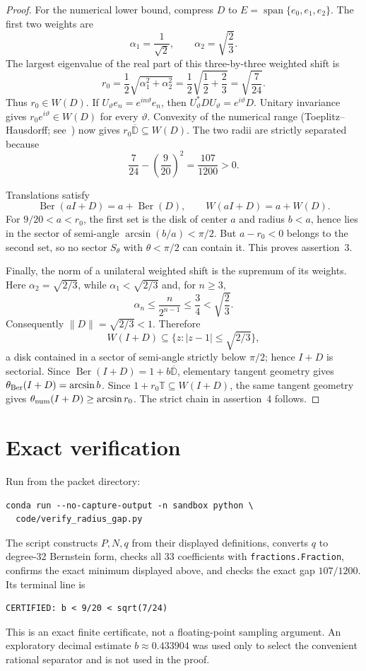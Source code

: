 \documentclass[11pt]{amsart}
\theoremstyle{definition}
\newcommand{\Ber}{\operatorname{Ber}}
\newcommand{\Num}{W}
\newcommand{\Disk}{\overline{\mathbb D}}
\begin{document}
\begin{proof}
For the numerical lower bound, compress \(D\) to
\(E=\operatorname{span}\{e_0,e_1,e_2\}\).  The first two weights are
\[
 \alpha_1=\frac1{\sqrt2},\qquad
 \alpha_2=\sqrt{\frac23}.
\]
The largest eigenvalue of the real part of this three-by-three weighted shift
is
\[
 r_0=\frac12\sqrt{\alpha_1^2+\alpha_2^2}
     =\frac12\sqrt{\frac12+\frac23}
     =\sqrt{\frac7{24}}.
\]
Thus \(r_0\in\Num(D)\).  If \(U_\vartheta e_n=e^{in\vartheta}e_n\), then
\(U_\vartheta^*DU_\vartheta=e^{i\vartheta}D\).  Unitary invariance gives
\(r_0e^{i\vartheta}\in\Num(D)\) for every \(\vartheta\).  Convexity of the
numerical range (Toeplitz--Hausdorff; see~\cite{gustafsonrao}) now gives
\(r_0\Disk\subseteq\Num(D)\).  The two radii are strictly separated because
\[
 \frac7{24}-\left(\frac9{20}\right)^2=\frac{107}{1200}>0.
\]

Translations satisfy
\[
 \Ber(aI+D)=a+\Ber(D),\qquad \Num(aI+D)=a+\Num(D).
\]
For \(9/20<a<r_0\), the first set is the disk of center \(a\) and radius
\(b<a\), hence lies in the sector of semi-angle \(\arcsin(b/a)<\pi/2\).
But \(a-r_0<0\) belongs to the second set, so no sector \(S_\theta\) with
\(\theta<\pi/2\) can contain it.  This proves assertion~3.

Finally, the norm of a unilateral weighted shift is the supremum of its
weights.  Here \(\alpha_2=\sqrt{2/3}\), while \(\alpha_1<\sqrt{2/3}\) and,
for \(n\ge3\),
\[
 \alpha_n\le\frac{n}{2^{n-1}}\le\frac34<\sqrt{\frac23}.
\]
Consequently \(\|D\|=\sqrt{2/3}<1\).  Therefore
\[
 \Num(I+D)\subseteq\{z:|z-1|\le\sqrt{2/3}\},
\]
a disk contained in a sector of semi-angle strictly below \(\pi/2\); hence
\(I+D\) is sectorial.  Since \(\Ber(I+D)=1+b\Disk\), elementary tangent
geometry gives \(\theta_{\rm Ber}(I+D)=\arcsin b\).  Since
\(1+r_0\mathbb T\subseteq\Num(I+D)\), the same tangent geometry gives
\(\theta_{\rm num}(I+D)\ge\arcsin r_0\).  The strict chain in assertion~4
follows.
\end{proof}

\section{Exact verification}

Run from the packet directory:
\begin{verbatim}
conda run --no-capture-output -n sandbox python \
  code/verify_radius_gap.py
\end{verbatim}
The script constructs \(P,N,q\) from their displayed definitions, converts
\(q\) to degree-32 Bernstein form, checks all 33 coefficients with
\texttt{fractions.Fraction}, confirms the exact minimum displayed above, and
checks the exact gap \(107/1200\).  Its terminal line is
\begin{verbatim}
CERTIFIED: b < 9/20 < sqrt(7/24)
\end{verbatim}
This is an exact finite certificate, not a floating-point sampling argument.
An exploratory decimal estimate \(b\approx0.433904\) was used only to select
the convenient rational separator and is not used in the proof.
\end{document}
